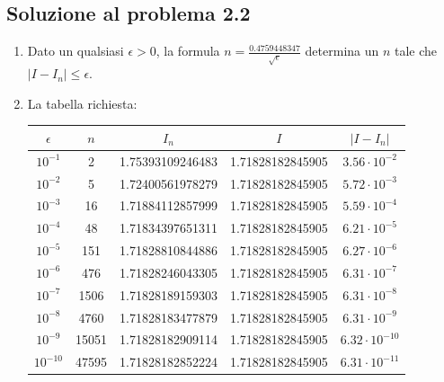 \documentclass[a4paper,12pt]{article}
\begin{document}
\subsection{Soluzione al problema 2.2}
\begin{enumerate}[label=(\alph*)]
\item Dato un qualsiasi $\epsilon>0$, la formula $n=\frac{0.4759448347}{\sqrt{\epsilon}
}$ determina un $n$ tale che $|I-I_n|\leq\epsilon$. 

\item  La tabella richiesta:
\begin{table}[h!]
  \begin{center}
    \label{tab:table1}
    \begin{tabular}{c|c|c|c|c} 
      $\epsilon$ & $n$ & $I_n$ & $I$ & $|I-I_n|$ \\
      \hline
       $10^{-1}$   &      2  &    1.75393109246483  &  1.71828182845905    & $3.56\cdot10^{-2}$\\
      $10^{-2}$   &      5 &    1.72400561978279   &  1.71828182845905     & $5.72\cdot10^{-3}$\\
     $10^{-3}$    &    16  &   1.71884112857999  &  1.71828182845905    & $5.59\cdot10^{-4}$\\
    $10^{-4}$     &   48  &  1.71834397651311  &  1.71828182845905    & $ 6.21\cdot10^{-5}$\\
     $10^{-5}$    &   151 &   1.71828810844886  &  1.71828182845905    & $6.27\cdot10^{-6}$\\
     $10^{-6}$    &   476  &  1.71828246043305  &  1.71828182845905    & $ 6.31\cdot10^{-7}$\\
     $10^{-7}$   &    1506   &    1.71828189159303   & 1.71828182845905    & $6.31\cdot10^{-8}$\\
     $10^{-8}$   &    4760  &   1.71828183477879   & 1.71828182845905    & $6.31\cdot10^{-9}$\\
     $10^{-9}$   &   15051 & 1.71828182909114   & 1.71828182845905    & $ 6.32\cdot10^{-10}$\\
     $10^{-10}$   &   47595   & 1.71828182852224  &  1.71828182845905    & $6.31\cdot10^{-11}$\\
     \end{tabular}
  \end{center}
\end{table}


\end{enumerate}
\end{document}
